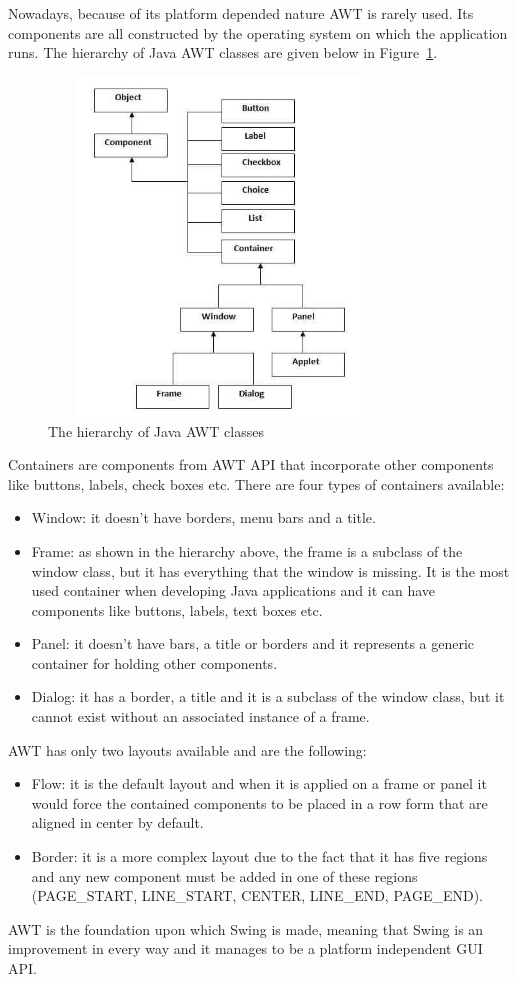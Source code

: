 \documentclass[12pt,a4paper]{report}
\begin{document}
Nowadays, because of its platform depended nature AWT is rarely used. Its components are all constructed by the operating system on which the application runs. The hierarchy of Java AWT classes are given below in Figure~\ref{fig:awt}.
\begin{figure}[!ht]
	\centering
	\includegraphics[width=9cm,height=9cm]{pics/awthierarchy.jpg}
	\caption{The hierarchy of Java AWT classes\protect\footnotemark}
	\label{fig:awt}
\end{figure}
\newpage
Containers are components from AWT API that incorporate other components like buttons, labels, check boxes etc. There are four types of containers available:
\begin{itemize}
	\item Window: it doesn't have borders, menu bars and a title.
	\item Frame: as shown in the hierarchy above, the frame is a subclass of the window class, but it has everything that the window is missing. It is the most used container when developing Java applications and it can have components like buttons, labels, text boxes etc.
	\item Panel: it doesn't have bars, a title or borders and it represents a generic container for holding other components.
	\item Dialog: it has a border, a title and it is a subclass of the window class, but it cannot exist without an associated instance of a frame.   
\end{itemize}
AWT has only two layouts available and are the following:
\begin{itemize}
	\item Flow: it is the default layout and when it is applied on a frame or panel it would force the contained components to be placed in a row form that are aligned in center by default.  
	\item Border: it is a more complex layout due to the fact that it has five regions and any new component must be added in one of these regions (PAGE\_START, LINE\_START, CENTER, LINE\_END, PAGE\_END). 
\end{itemize}
AWT is the foundation upon which Swing is made, meaning that Swing is an improvement in every way and it manages to be a platform independent GUI API.
\end{document}
